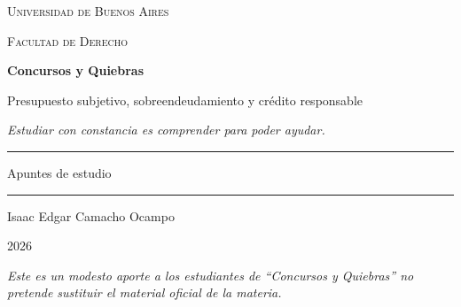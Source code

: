 \documentclass[12pt,oneside]{book}
\newcommand{\universidad}{Universidad de Buenos Aires}
\newcommand{\facultad}{Facultad de Derecho}
\newcommand{\materia}{Concursos y Quiebras}
\newcommand{\titulo}{Presupuesto subjetivo, sobreendeudamiento y crédito responsable}
\newcommand{\autor}{Isaac Edgar Camacho Ocampo}
\newcommand{\anio}{2026}
\begin{document}
\begin{titlepage}

\thispagestyle{empty}

\begin{center}

\vspace*{1cm}

{\large \textsc{\universidad}}

\vspace{0.2cm}

{\large \textsc{\facultad}}

\vspace{3cm}

{\Huge \textbf{\materia}}

\vspace{1cm}

{\LARGE \titulo}

\vspace{0.8cm}

\textit{Estudiar con constancia es comprender para poder ayudar.}

\vspace{1.2cm}

\rule{0.70\textwidth}{0.5pt}

\vspace{0.5cm}

{\large Apuntes de estudio}

\vspace{0.5cm}

\rule{0.70\textwidth}{0.5pt}

\vfill

{\large \autor}

\vspace{0.3cm}

{\large \anio}

\end{center}

\vfill

\begin{flushleft}
\textit{Este es un modesto aporte a los estudiantes de ``\materia'' no pretende sustituir el material oficial de la materia.}
\end{flushleft}

\end{titlepage}

\tableofcontents
\end{document}
